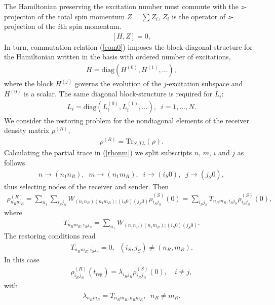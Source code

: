 \documentclass[pra,preprint,showpacs]{revtex4-1}
\begin{document}
The Hamiltonian preserving the excitation number must commute with the $z$-projection of the total spin momentum $Z=\sum Z_i$, $Z_i$ is the operator of $z$-projection of the $i$th spin momentum.
\begin{eqnarray}\label{com0}\label{com}
[H,Z]=0,
\end{eqnarray}
In turn, commutation relation (\ref{com0}) imposes the block-diagonal structure for  the Hamiltonian written in the basis with ordered number of excitations,
\begin{eqnarray}\label{bH}
H={\mbox{diag}} (H^{(0)},H^{(1)},\dots ),
\end{eqnarray}
where the  block $H^{(j)}$ governs the evolution of the $j$-excitation subspace and $H^{(0)}$ is a scalar.
The same diagonal block-structure is required for $L_i$:
\begin{eqnarray}\label{bH}
L_i={\mbox{diag}} (L_i^{(0)},L_i^{(1)},\dots ), \;\; i=1,\dots,N.
\end{eqnarray}
We consider the restoring problem for the  nondiagonal elements of the receiver density matrix $\rho^{(R)}$,
\begin{eqnarray}\label{R}
\rho^{(R)}={\mbox{Tr}}_{S,TL}(\rho).
\end{eqnarray}
Calculating the partial trace in (\ref{rhonm}) we
 split subscripts $n$, $m$, $i$ and $j$ as follows
\begin{eqnarray}\label{SR}
n\to (n_1 n_R), \;\;m\to (n_1 m_R),\;\;i\to (i_S 0),  \;\;j\to (j_S 0),
\end{eqnarray}
thus selecting nodes of  the receiver  and sender.
Then
\begin{eqnarray}
\rho^{(R)}_{n_Rm_R} =\sum_{n_1} \sum_{i_Sj_S}W_{(n_1 n_R)(n_1m_R);(i_S0)(j_S0)} \rho^{(S)}_{i_Sj_S}(0)  =\sum_{i_Sj_S} T_{n_Rm_R;i_Sj_S}  \rho^{(S)}_{i_Sj_S}(0)  ,
\end{eqnarray}
where
\begin{eqnarray}
T_{n_Rm_R;i_Sj_S} =\sum_{n_1}W_{(n_1 n_R)(n_1m_R);(i_S0)(j_S0)} .
\end{eqnarray}
The restoring conditions read
\begin{eqnarray}\label{restor1}\label{constr0}
T_{n_Rm_R;i_Sj_S} =0, \;\;(i_S,j_S)\neq (n_R,m_R) .
\end{eqnarray}
In this case
\begin{eqnarray}\label{rest}
\rho^{(R)}_{i_Rj_R}(t_{\mathrm{reg}}) = \lambda_{i_Rj_R} \rho^{(S)}_{i_Rj_R}(0), \quad i\neq j,
\end{eqnarray}
with
\begin{eqnarray}\label{lambda1}
\lambda_{n_Rm_R} =T_{n_Rm_R;n_Rm_R}, \;\; n_R\neq m_R.
\end{eqnarray}
\end{document}
